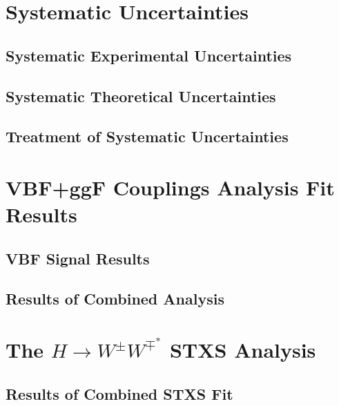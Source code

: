 \section{Systematic Uncertainties}
\subsection{Systematic Experimental Uncertainties}
\subsection{Systematic Theoretical Uncertainties}
\subsection{Treatment of Systematic Uncertainties}

\section{\HWW VBF+ggF Couplings Analysis Fit Results}
\subsection{VBF Signal Results}
\subsection{Results of Combined Analysis}

\section{The $H\rightarrow W^{\pm}W^{\mp^*}$ STXS Analysis}
\subsection{Results of Combined STXS Fit}
